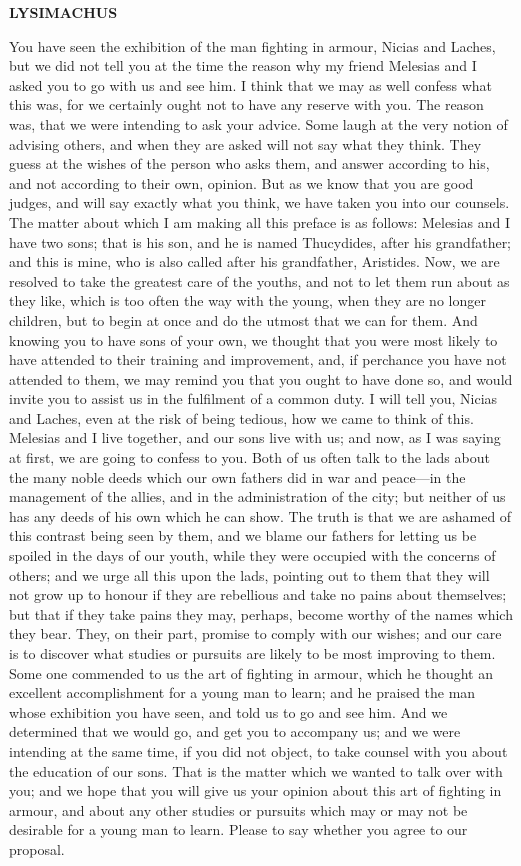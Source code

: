 \documentclass[11pt,letter]{book}
\begin{document}
\par \textbf{LYSIMACHUS}
\par   You have seen the exhibition of the man fighting in armour, Nicias and Laches, but we did not tell you at the time the reason why my friend Melesias and I asked you to go with us and see him. I think that we may as well confess what this was, for we certainly ought not to have any reserve with you. The reason was, that we were intending to ask your advice. Some laugh at the very notion of advising others, and when they are asked will not say what they think. They guess at the wishes of the person who asks them, and answer according to his, and not according to their own, opinion. But as we know that you are good judges, and will say exactly what you think, we have taken you into our counsels. The matter about which I am making all this preface is as follows:  Melesias and I have two sons; that is his son, and he is named Thucydides, after his grandfather; and this is mine, who is also called after his grandfather, Aristides. Now, we are resolved to take the greatest care of the youths, and not to let them run about as they like, which is too often the way with the young, when they are no longer children, but to begin at once and do the utmost that we can for them. And knowing you to have sons of your own, we thought that you were most likely to have attended to their training and improvement, and, if perchance you have not attended to them, we may remind you that you ought to have done so, and would invite you to assist us in the fulfilment of a common duty. I will tell you, Nicias and Laches, even at the risk of being tedious, how we came to think of this. Melesias and I live together, and our sons live with us; and now, as I was saying at first, we are going to confess to you. Both of us often talk to the lads about the many noble deeds which our own fathers did in war and peace—in the management of the allies, and in the administration of the city; but neither of us has any deeds of his own which he can show. The truth is that we are ashamed of this contrast being seen by them, and we blame our fathers for letting us be spoiled in the days of our youth, while they were occupied with the concerns of others; and we urge all this upon the lads, pointing out to them that they will not grow up to honour if they are rebellious and take no pains about themselves; but that if they take pains they may, perhaps, become worthy of the names which they bear. They, on their part, promise to comply with our wishes; and our care is to discover what studies or pursuits are likely to be most improving to them. Some one commended to us the art of fighting in armour, which he thought an excellent accomplishment for a young man to learn; and he praised the man whose exhibition you have seen, and told us to go and see him. And we determined that we would go, and get you to accompany us; and we were intending at the same time, if you did not object, to take counsel with you about the education of our sons. That is the matter which we wanted to talk over with you; and we hope that you will give us your opinion about this art of fighting in armour, and about any other studies or pursuits which may or may not be desirable for a young man to learn. Please to say whether you agree to our proposal.
\end{document}
